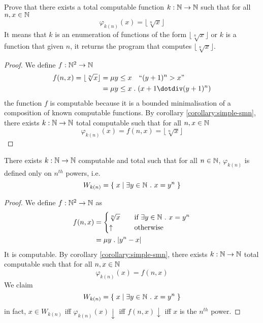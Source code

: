 \begin{example}
  Prove that there exists a total computable function $k : \mathbb{N} \to \mathbb{N}$ such that
  for all $n, x \in \mathbb{N}$
  \[
    \varphi_{k(n)}(x) = \lfloor \sqrt[n]{x} \rfloor
  \]
  It means that $k$ is an enumeration of functions of the form
  $\lfloor \sqrt[n]{x} \rfloor$ or $k$ is a function that given
  $n$, it returns the program that computes $\lfloor \sqrt[n]{x}
  \rfloor$.
\begin{proof}
  We define $f : \mathbb{N}^2 \to \mathbb{N}$
\begin{align*}
  f(n,x) = \lfloor \sqrt[n]{x} \rfloor &= \mu y \leq x \quad \mbox{``}(y+1)^n > x\mbox{''} \\
      &= \mu y \leq x \; . \; (x+1 \dotdiv (y+1)^n)
\end{align*}
  the function $f$ is computable because it is a bounded minimalisation of a composition of known computable functions.
  By corollary
  \ref{corollary:simple-smn}, there exists $k: \mathbb{N} \to \mathbb{N}$ total computable such that for all $n, x \in \mathbb{N}$
  \[
    \varphi_{k(n)}(x) = f(n,x) = \lfloor \sqrt[n]{x} \rfloor
  \]
\end{proof}
\end{example}

\begin{example}
  There exists $k : \mathbb{N} \to \mathbb{N}$ computable and total such that for all $n \in \mathbb{N}$,
  $\varphi_{k(n)}$ is defined only on $n^{th}$
  powers, i.e.
  \[
    W_{k(n)} = \{ \; x \; | \; \exists y \in \mathbb{N} \ . \ x = y^n \; \}
  \]
\begin{proof}
We define $f : \mathbb{N}^2 \rightarrow \mathbb{N}$ as
  \begin{align*}
    f(n,x) &= \begin{cases}
      \sqrt[n]{x} & \quad \mbox{if } \exists y \in \mathbb{N} \ . \ x = y^n \\
      \uparrow &\quad \mbox{otherwise}
    \end{cases} \\
    & = \mu y \; . \; |y^n-x|
  \end{align*}
  It is computable. By corollary
  \ref{corollary:simple-smn}, there exists $k: \mathbb{N} \to \mathbb{N}$ total computable such that for all $n, x \in \mathbb{N}$
  \[
    \varphi_{k(n)}(x) = f(n,x)
  \]
  We claim 
  \[
    W_{k(n)} = \{ \; x \; | \; \exists y \in \mathbb{N} \ . \ x = y^n \; \}
  \]
  in fact, $x \in W_{k(n)}$ iff
  $\varphi_{k(n)}(x)\downarrow$ iff $f(n,x)\downarrow$ iff $x$ is the
  $n^{th}$ power.
\end{proof}
\end{example}

